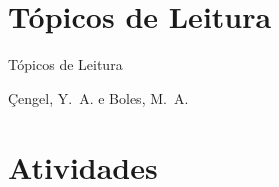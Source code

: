 \section{Tópicos de Leitura}

    \begin{frame}{Tópicos de Leitura}
        \begin{thebibliography}{Çengel, Y.~A., 2013}
                Çengel, Y.~A. e Boles, M.~A.
        \end{thebibliography}
    \end{frame}

\section{Atividades}

